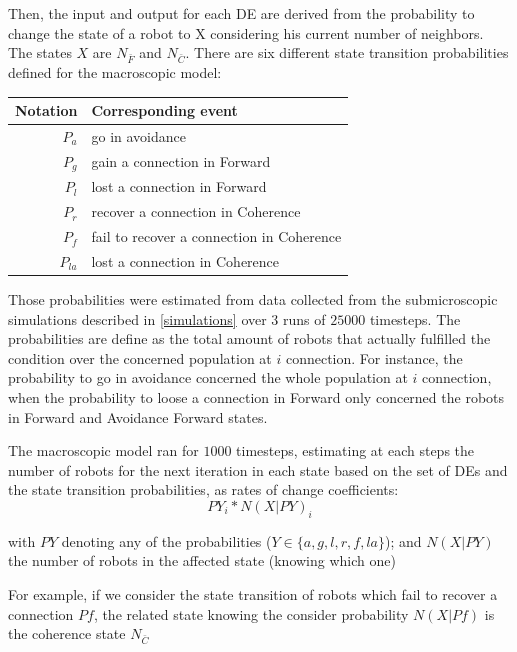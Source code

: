 \documentclass[a4paper, 10pt, conference]{ieeeconf}
\begin{document}
  Then, the input and output for each DE are derived from the probability to change the state of a robot to X considering his current number of neighbors. The states $X$ are $N_{\bar F}$ and $N_{\bar C}$. There are six different state transition probabilities defined for the macroscopic model:

  \begin{table}[h]
    \begin{center}
      \begin{tabular}{r|l}
        \hline
        Notation   & Corresponding event \\
        \hline
        $P_a$      & go in avoidance \\
        $P_g$      & gain a connection in Forward \\
        $P_l$      & lost a connection in Forward \\
        $P_r$      & recover a connection in Coherence \\
        $P_f$      & fail to recover a connection in Coherence \\
        $P_{la}$   & lost a connection in Coherence \\
        \hline
      \end{tabular}
    \end{center}
  \end{table}

  Those probabilities were estimated from data collected from the submicroscopic simulations described in \ref{simulations} over 3 runs of $25 000$ timesteps. The probabilities are define as the total amount of robots that actually fulfilled the condition over the concerned population at $i$ connection. For instance, the probability to go in avoidance concerned the whole population at $i$ connection, when the probability to loose a connection in Forward only concerned the robots in Forward and Avoidance Forward states.

  The macroscopic model ran for $1000$ timesteps, estimating at each steps the number of robots for the next iteration in each state based on the set of DEs and the state transition probabilities, as rates of change coefficients:
  \[
    PY_i * N(X|PY)_i
  \]

  with $PY$ denoting any of the probabilities ($Y \in \{a, g, l, r, f, la\}$); and $N(X|PY)$ the number of robots in the affected state (knowing which one)

  For example, if we consider the state transition of robots which fail to recover a connection $Pf$, the related state knowing the consider probability $N(X|Pf)$ is the coherence state $N_{\bar C}$
\end{document}

